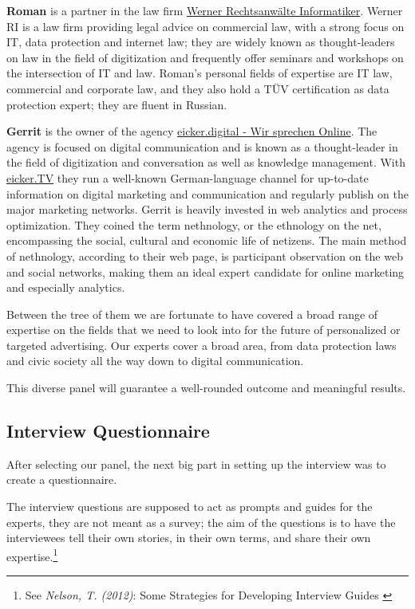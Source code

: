 \textbf{Roman} is a partner in the law firm \href{https://www.werner-ri.de/}{Werner Rechtsanwälte Informatiker}. Werner RI is a law firm providing legal advice on commercial law, with a strong focus on IT, data protection and internet law; they are widely known as thought-leaders on law in the field of digitization and frequently offer seminars and workshops on the intersection of IT and law. Roman's personal fields of expertise are IT law, commercial and corporate law, and they also hold a TÜV certification as data protection expert; they are fluent in Russian.

\textbf{Gerrit} is the owner of the agency \href{https://eicker.digital/}{eicker.digital - Wir sprechen Online}. The agency is focused on digital communication and is known as a thought-leader in the field of digitization and conversation as well as knowledge management. With \href{https://www.youtube.com/eickertv}{eicker.TV} they run a well-known German-language channel for up-to-date information on digital marketing and communication and regularly publish on the major marketing networks. Gerrit is heavily invested in web analytics and process optimization. They coined the term nethnology, or the ethnology on the net, encompassing the social, cultural and economic life of netizens. The main method of nethnology, according to their web page, is participant observation on the web and social networks, making them an ideal expert candidate for online marketing and especially analytics.

Between the tree of them we are fortunate to have covered a broad range of expertise on the fields that we need to look into for the future of personalized or targeted advertising. Our experts cover a broad area, from data protection laws and civic society all the way down to digital communication. 

This diverse panel will guarantee a well-rounded outcome and meaningful results.

\subsection{Interview Questionnaire}

After selecting our panel, the next big part in setting up the interview was to create a questionnaire.

The interview questions are supposed to act as prompts and guides for the experts, they are not meant as a survey; the aim of the questions is to have the interviewees tell their own stories, in their own terms, and share their own expertise.\footnote{See \textit{Nelson, T. (2012)}: Some Strategies for Developing Interview Guides \cite{qualiStrategies}}

